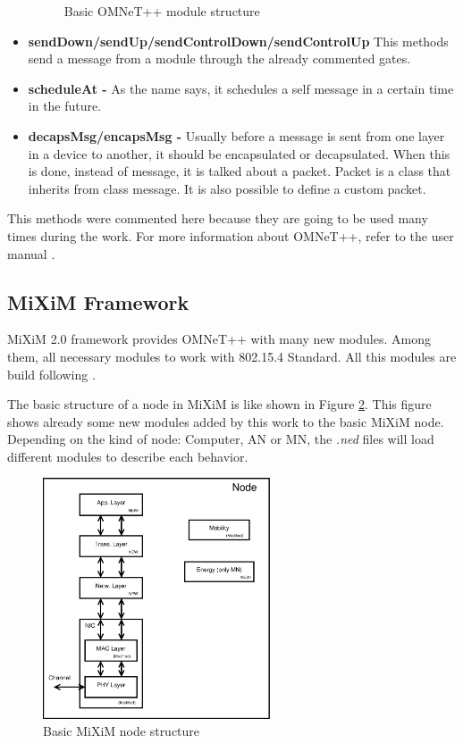 \begin{itemize}
\begin{figure}[ht]
 \caption{Basic \ac{OMNeT++} module structure}
 \label{fig:omnetmodule}
\end{figure}
 \item \textbf{sendDown/sendUp/sendControlDown/sendControlUp }This methods send a message from a module through the already commented gates.
 \item \textbf{scheduleAt - }As the name says, it schedules a self message in a certain time in the future.
 \item \textbf{decapsMsg/encapsMsg - }Usually before a message is sent from one layer in a device to another, it should be encapsulated or 
decapsulated. When this is done, instead of message, it is talked about a packet. Packet is a class that inherits from class message. It is 
also possible to define a custom packet.
\end{itemize}

This methods were commented here because they are going to be used many times during the work. For more information about \ac{OMNeT++}, 
refer to the user manual \cite{manualomnet}.

\subsection{\ac{MiXiM} Framework}

\ac{MiXiM} 2.0 framework provides \ac{OMNeT++} with many new modules. Among them, all necessary modules to work with 802.15.4 Standard. 
All this modules are build following \cite{IEEE802.15.4-2006}.

The basic structure of a node in \ac{MiXiM} is like shown in Figure \ref{fig:miximmodule}. This figure shows already some new modules added by
this work to the basic \ac{MiXiM} node. Depending on the kind of node: Computer, \ac{AN} or \ac{MN}, the \textit{.ned} files will load 
different modules to describe each behavior.

\begin{figure}[ht]
 \begin{center}
  \includegraphics[width=0.6\textwidth]{miximmodule.eps}
 \end{center}
 \caption{Basic \ac{MiXiM} node structure}
 \label{fig:miximmodule}
\end{figure}

